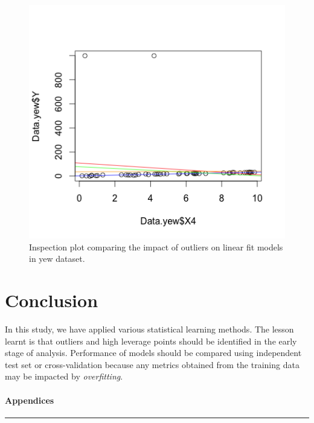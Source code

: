 \documentclass{article}
\begin{document}
\begin{figure}[h!]
  \includegraphics[width=\linewidth]{project/images/13-yew.png}
  \caption{Inspection plot comparing the impact of outliers on linear fit models in yew dataset.}
  \label{fig:13-yew}
\end{figure}

\section{Conclusion}

In this study, we have applied various statistical learning methods. The lesson learnt is that outliers and high leverage points should be identified in the early stage of analysis. Performance of models should be compared using independent test set or cross-validation because any metrics obtained from the training data may be impacted by {\em overfitting}.

\clearpage


\paragraph{Appendices}



\rule{\textwidth}{1pt}


\end{document}
